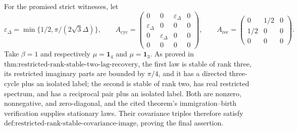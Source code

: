 For the promised strict witnesses, let
\[
 \varepsilon_\Delta=\min\{1/2,\pi/(2\sqrt3\Delta)\},\qquad
 A_{\mathrm{cyc}}=
 \begin{pmatrix}
 0&0&\varepsilon_\Delta&0\\
 \varepsilon_\Delta&0&0&0\\
 0&\varepsilon_\Delta&0&0\\
 0&0&0&0
 \end{pmatrix},\qquad
 A_{\mathrm{rec}}=
 \begin{pmatrix}
 0&1/2&0\\
 1/2&0&0\\
 0&0&0
 \end{pmatrix}.
\tag{7}
\]
Take \(\beta=1\) and respectively \(\mu=\mathbf 1_4\) and \(\mu=\mathbf 1_3\).  As proved in \(\text{thm:restricted-rank-stable-two-lag-recovery}\), the first law is stable of rank three, its restricted imaginary parts are bounded by \(\pi/4\), and it has a directed three-cycle plus an isolated label; the second is stable of rank two, has real restricted spectrum, and has a reciprocal pair plus an isolated label.  Both are nonzero, nonnegative, and zero-diagonal, and the cited theorem's immigration--birth verification supplies stationary laws.  Their covariance triples therefore satisfy \(\text{def:restricted-rank-stable-covariance-image}\), proving the final assertion.